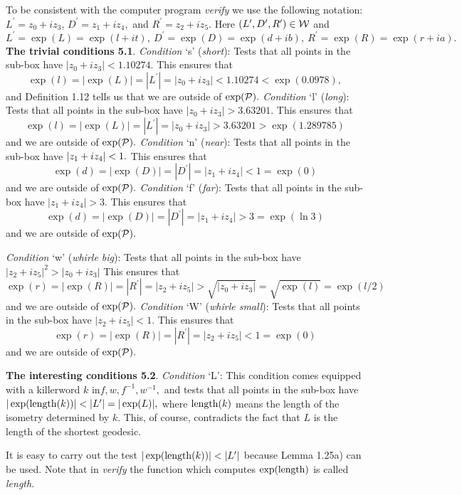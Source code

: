 To be consistent with the computer program {\it verify} we use the following notation: $L^{\prime} = z_0 + i z_3$,
$D^{\prime} = z_1 + i z_4,$ and $R^{\prime} = z_2 + i z_5.$  Here $(L^{\prime}, D^{\prime}, R^{\prime}) \in {\cal W}$ and
$L^{\prime} = \exp(L) = \exp(l+it),\   D^{\prime} = \exp(D) = \exp(d+ib),\  
R^{\prime} = \exp(R) = \exp(r+ia).$
 {{\bf The trivial conditions  5.1}}.
{\it Condition} `s' ({\it short}):  Tests that all points in the sub-box have $|z_0 + i z_3| < 1.10274.$  This ensures that  
$$\exp(l) = |\exp(L)| = |L^{\prime}| = |z_0 + i z_3| < 1.10274 < \exp(0.0978),$$  and Definition 1.12 tells us that we are
outside of $\exp({\cal P}).$
{\it Condition} `l' ({\it long}): Tests that all points in the sub-box have $|z_0 + i z_3| > 3.63201.$  This ensures that  
$$\exp(l) = |\exp(L)| = |L^{\prime}| = |z_0 + i z_3| > 3.63201 > \exp(1.289785)$$ and we are outside of $\exp({\cal P}).$  
\vglue6pt
{\it Condition} `n' ({\it near}): Tests that all points in the sub-box have $|z_1 + i z_4|\break < 1.$  This ensures that 
$$\exp(d) = |\exp(D)| = |D^{\prime}| = |z_1 + i z_4| <1= \exp(0)$$ and we are outside of $\exp({\cal P}).$
\vglue6pt
{\it Condition} `f' ({\it far}): Tests that all points in the sub-box have $|z_1 + i z_4| > 3.$  This ensures that 
$$\exp(d) = |\exp(D)| = |D^{\prime}| = |z_1 + i z_4|  > 3= \exp(\ln 3)$$ and we are outside of $\exp({\cal P}).$  
\eject

{\it Condition} `w' ({\it whirle  big}): Tests that all points in the sub-box have $|z_2 + i z_5|^2 > |z_0 + i z_3| $  This
ensures that $$\exp(r) = |\exp(R)| = |R^{\prime}| = |z_2 + i z_5|  > \sqrt{|z_0 + i z_3|} =  \sqrt {\exp(l)} = \exp(l/2)$$ and
we are outside of $\exp({\cal P}).$  
{\it Condition} `W' ({\it whirle  small}): Tests that all points in the sub-box have $|z_2 + i z_5| < 1. $  This ensures that
$$\exp(r) = |\exp(R)| = |R^{\prime}| = |z_2 + i z_5|  < 1 = \exp(0)$$ and we are outside of $\exp({\cal P}).$

 {{\bf The interesting conditions 5.2}}.
{\it Condition}  `L': This condition comes equipped with a killerword $k$ in\break $f, w, f^{-1}, w^{-1},$ and tests that all
points in the sub-box have $|\exp({\rm length}(k))| <  |L^{\prime}| = |\exp(L)|,$ where ${\rm length}(k)$ means the length
of the isometry determined by $k.$   This, of course, contradicts the fact that $L$ is the length of the shortest geodesic.

It is easy to carry out the test $|\exp({\rm length}(k))| <  |L^{\prime}|$ because
Lemma 1.25a) can be used.
Note that in {\it verify} the function which computes $\exp({\rm length})$ is called {\it length}.  

